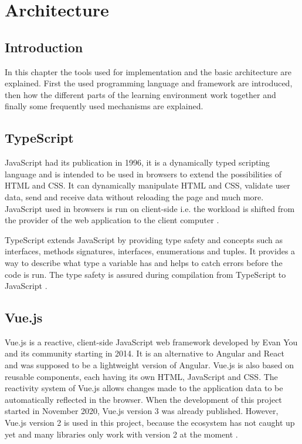 \chapter{Architecture}
\label{chapter:architecture}

\section{Introduction}
\label{section:introduction}
In this chapter the tools used for implementation and the basic architecture are explained. First the used programming language and framework are introduced, then how the different parts of the learning environment work together and finally some frequently used mechanisms are explained.

\section{TypeScript}
\label{section:typescript}
JavaScript had its publication in 1996, it is a dynamically typed scripting language and is intended to be used in browsers to extend the possibilities of HTML and CSS. It can dynamically manipulate HTML and CSS, validate user data, send and receive data without reloading the page and much more. JavaScript used in browsers is run on client-side i.e. the workload is shifted from the provider of the web application to the client computer \cite{Javascript}. 

TypeScript extends JavaScript by providing type safety and concepts such as interfaces, methods signatures, interfaces, enumerations and tuples. It provides a way to describe what type a variable has and helps to catch errors before the code is run. The type safety is assured during compilation from TypeScript to JavaScript \cite{Typescript}.

\section{Vue.js}
\label{section:vuejs}
Vue.js is a reactive, client-side JavaScript web framework developed by Evan You and its community starting in 2014. It is an alternative to Angular and React and was supposed to be a lightweight version of Angular. Vue.js is also based on reusable components, each having its own HTML, JavaScript and CSS. The reactivity system of Vue.js allows changes made to the application data to be automatically reflected in the browser.
When the development of this project started in November 2020, Vue.js version 3 was already published. However, Vue.js version 2 is used in this project, because the ecosystem has not caught up yet and many libraries only work with version 2 at the moment \cite{Vue}.

